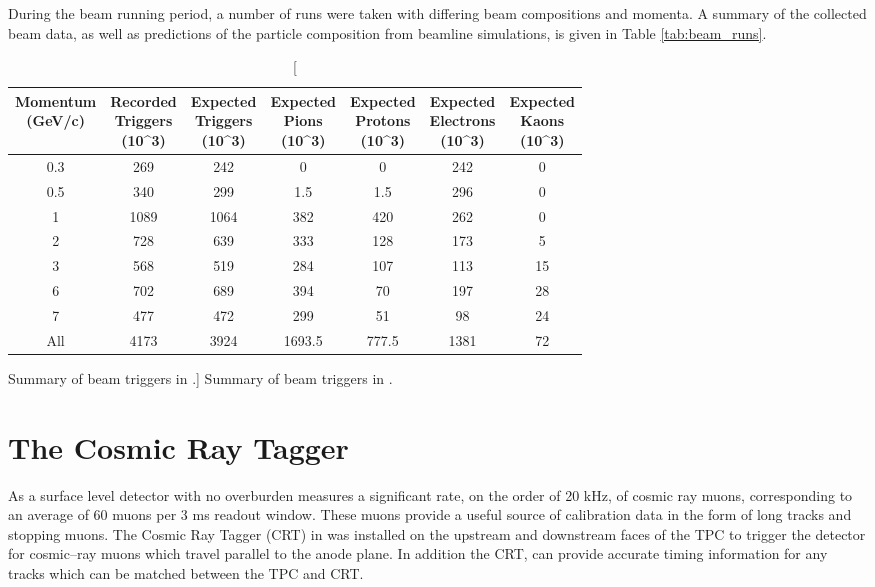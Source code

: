 During the beam running period, a number of runs were taken with differing beam
compositions and momenta. A summary of the collected beam data, as well as
predictions of the particle composition from beamline simulations, is given in 
Table \ref{tab:beam_runs}.
\begin{table}
	\centering
	\begin{tabular}{c|c|c|c|c|c|c}
		\thead{Momentum \\ (GeV/c)} & \thead{Recorded \\ Triggers \\ (10^3)} &
		\thead{Expected \\Triggers \\ (10^3)} & \thead{Expected \\ Pions \\ (10^3)} &
		\thead{Expected \\Protons \\ (10^3)} & \thead{Expected \\Electrons \\ (10^3)} &
		\thead{Expected \\ Kaons \\ (10^3)} \\ \hline
		0.3 & 269  & 242  & 0      & 0     & 242  & 0 \\
		0.5 & 340  & 299  & 1.5    & 1.5   & 296  & 0 \\
		1   & 1089 & 1064 & 382    & 420   & 262  & 0 \\
		2   & 728  & 639  & 333    & 128   & 173  & 5 \\
		3   & 568  & 519  & 284    & 107   & 113  & 15 \\
		6   & 702  & 689  & 394    & 70    & 197  & 28 \\
		7   & 477  & 472  & 299    & 51    & 98   & 24 \\ \hline
		All & 4173 & 3924 & 1693.5 & 777.5 & 1381 & 72 \\
	\end{tabular}
	\caption
	[Summary of beam triggers in \protodune{}.]
	{ Summary of beam triggers in \protodune{}. }
\end{table}

\section{The Cosmic Ray Tagger} \label{sec:pdsp_cosmic}

As a surface level detector with no overburden \protodune{} measures a
significant rate, on the order of 20 kHz, of cosmic ray muons, corresponding 
to an average of 60 muons per 3 ms readout window. These muons provide a 
useful source of calibration data in the form of long tracks and stopping 
muons.  The Cosmic Ray Tagger (CRT) in \protodune{} was installed on the 
upstream and downstream faces of the TPC to trigger the detector for 
cosmic--ray muons which travel parallel to the anode plane. In addition the 
CRT, can provide accurate timing information for any tracks which can be matched
between the TPC and CRT.

